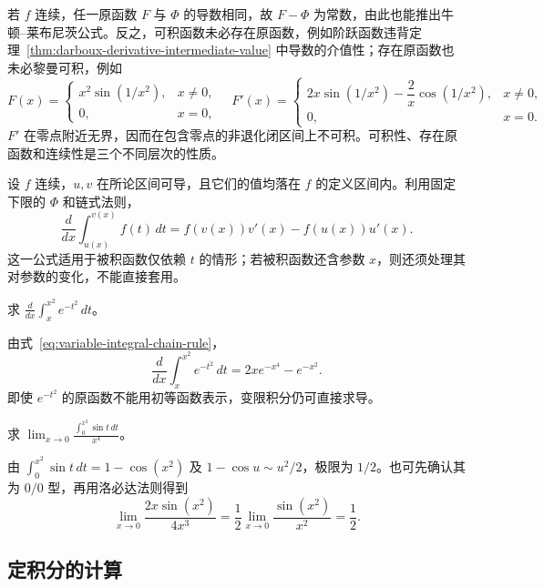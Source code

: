 \documentclass[UTF8,12pt,a4paper,fontset=fandol]{ctexbook}
\begin{document}
若 $f$ 连续，任一原函数 $F$ 与 $\Phi$ 的导数相同，故 $F-\Phi$ 为常数，由此也能推出牛顿--莱布尼茨公式。反之，可积函数未必存在原函数，例如阶跃函数违背定理~\ref{thm:darboux-derivative-intermediate-value} 中导数的介值性；存在原函数也未必黎曼可积，例如
\[
    F(x)=
    \begin{cases}x^2\sin(1/x^2),&x\neq0,\\0,&x=0,\end{cases}
    \quad
    F'(x)=
    \begin{cases}2x\sin(1/x^2)-\dfrac2x\cos(1/x^2),&x\neq0,\\0,&x=0.\end{cases}
\]
$F'$ 在零点附近无界，因而在包含零点的非退化闭区间上不可积。可积性、存在原函数和连续性是三个不同层次的性质。

设 $f$ 连续，$u,v$ 在所论区间可导，且它们的值均落在 $f$ 的定义区间内。利用固定下限的 $\Phi$ 和链式法则，
\begin{equation}
    \frac{d}{dx}\int_{u(x)}^{v(x)}f(t)\,dt
    =f(v(x))v'(x)-f(u(x))u'(x).
    \label{eq:variable-integral-chain-rule}
\end{equation}
这一公式适用于被积函数仅依赖 $t$ 的情形；若被积函数还含参数 $x$，则还须处理其对参数的变化，不能直接套用。

\begin{example}
\label{ex:variable-gaussian-integral-derivative}
求 $\displaystyle\frac{d}{dx}\int_x^{x^2}e^{-t^2}\,dt$。
\end{example}
\begin{solve}
由式~\eqref{eq:variable-integral-chain-rule}，
\[
    \frac{d}{dx}\int_x^{x^2}e^{-t^2}\,dt
    =2xe^{-x^4}-e^{-x^2}.
\]
即使 $e^{-t^2}$ 的原函数不能用初等函数表示，变限积分仍可直接求导。
\end{solve}

\begin{example}
\label{ex:variable-integral-limit}
求 $\displaystyle\lim_{x\to0}\frac{\int_0^{x^2}\sin t\,dt}{x^4}$。
\end{example}
\begin{solve}
由 $\int_0^{x^2}\sin t\,dt=1-\cos(x^2)$ 及 $1-\cos u\sim u^2/2$，极限为 $1/2$。也可先确认其为 $0/0$ 型，再用洛必达法则得到
\[
    \lim_{x\to0}\frac{2x\sin(x^2)}{4x^3}
    =\frac12\lim_{x\to0}\frac{\sin(x^2)}{x^2}=\frac12.
\]
\end{solve}

\subsection{定积分的计算}
\label{subsec:evaluation-of-definite-integrals}
\end{document}
